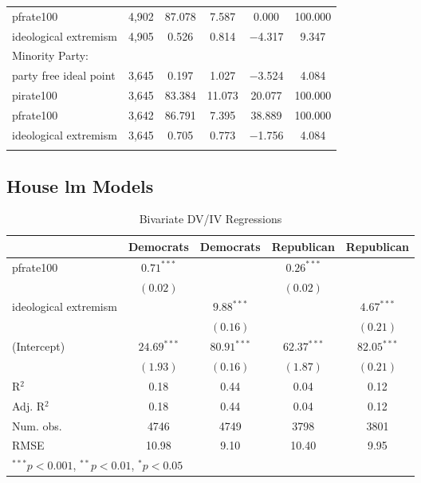\documentclass[12pt]{article}
\begin{document}
\begin{table}[!htbp]
\begin{tabular}{@{\extracolsep{5pt}}lccccc}
		pfrate100 & 4,902 & 87.078 & 7.587 & 0.000 & 100.000 \\ 
		ideological extremism & 4,905 & 0.526 & 0.814 & $-$4.317 & 9.347 \\ 
		\hline
		Minority Party: & & & & & \\
		\hline
		party free ideal point & 3,645 & 0.197 & 1.027 & $-$3.524 & 4.084 \\ 
		pirate100 & 3,645 & 83.384 & 11.073 & 20.077 & 100.000 \\ 
		pfrate100 & 3,642 & 86.791 & 7.395 & 38.889 & 100.000 \\ 
		ideological extremism & 3,645 & 0.705 & 0.773 & $-$1.756 & 4.084 \\ 
		\hline \\[-1.8ex] 
	\end{tabular} 
\end{table} 

\pagebreak

\subsection{House lm Models}


\begin{table}[!htb]
	\begin{center}
		\caption{Bivariate DV/IV Regressions}
		\begin{tabular}{l c c c c }
			\hline
			& Democrats & Democrats & Republican & Republican \\
			\hline
			pfrate100              & $0.71^{***}$  &               & $0.26^{***}$  &               \\
			& $(0.02)$      &               & $(0.02)$      &               \\
			ideological extremism &               & $9.88^{***}$  &               & $4.67^{***}$  \\
			&               & $(0.16)$      &               & $(0.21)$      \\
			(Intercept)            & $24.69^{***}$ & $80.91^{***}$ & $62.37^{***}$ & $82.05^{***}$ \\
			& $(1.93)$      & $(0.16)$      & $(1.87)$      & $(0.21)$      \\
			\hline
			R$^2$                  & 0.18          & 0.44          & 0.04          & 0.12          \\
			Adj. R$^2$             & 0.18          & 0.44          & 0.04          & 0.12          \\
			Num. obs.              & 4746          & 4749          & 3798          & 3801          \\
			RMSE                   & 10.98         & 9.10          & 10.40         & 9.95          \\
			\hline
			\multicolumn{5}{l}{\scriptsize{$^{***}p<0.001$, $^{**}p<0.01$, $^*p<0.05$}}
		\end{tabular}
	\end{center}
\end{table}
\end{document}
